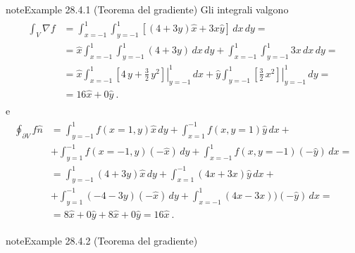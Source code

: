 \documentclass[letterpaper,10pt,italian]{jupyterBook}
\begin{document}
\begin{sphinxadmonition}{note}{Example 28.4.1 (Teorema del gradiente)}
\sphinxAtStartPar
Gli integrali valgono
\begin{equation*}
\begin{split}\begin{aligned}
  \int_V \nabla f
  & = \int_{x=-1}^{1} \int_{y=-1}^{1} \left[ (4 + 3 y) \hat{x} + 3 x \hat{y} \right] \, dx \, dy = \\
  & = \hat{x} \int_{x=-1}^{1} \int_{y=-1}^{1} (4 + 3 y) \, dx \, dy +  \int_{x=-1}^{1} \int_{y=-1}^{1} 3 x \, dx \, dy = \\
  & = \hat{x} \int_{x=-1}^{1} \left.\left[ 4 \, y + \frac{3}{2} \, y^2 \right]\right|_{y=-1}^{1} \, dx
    + \hat{y} \int_{y=-1}^{1} \left.\left[ \frac{3}{2} \, x^2 \right]\right|_{y=-1}^{1} \, dy = \\
  & = 16 \hat{x} + 0 \hat{y} \ .
\end{aligned}\end{split}
\end{equation*}
\sphinxAtStartPar
e
\begin{equation*}
\begin{split}\begin{aligned}
  \oint_{\partial V} f \hat{n}
  & = \int_{y = -1}^{ 1} f(x= 1, y   ) \hat{x} \, dy 
    + \int_{x =  1}^{-1} f(x   , y= 1) \hat{y} \, dx + \\ 
  & + \int_{y =  1}^{-1} f(x=-1, y   ) (- \hat{x} ) \, dy 
    + \int_{x = -1}^{ 1} f(x   , y=-1) (- \hat{y} ) \, dx = \\
  & = \int_{y = -1}^{ 1} ( 4     + 3     y )  \hat{x} \, dy 
    + \int_{x =  1}^{-1} ( 4  x  + 3  x    )  \hat{y} \, dx + \\ 
  & + \int_{y =  1}^{-1} (-4     - 3     y )  (- \hat{x} ) \, dy 
    + \int_{x = -1}^{ 1} ( 4  x  - 3  x   ))  (- \hat{y} ) \, dx = \\
  & = 8 \hat{x} + 0 \hat{y} + 8 \hat{x} + 0 \hat{y}
    = 16 \hat{x} \ .
\end{aligned}\end{split}
\end{equation*}\end{sphinxadmonition}
\label{ch/vector-calculus/stokes:thm-gradient-2}
\begin{sphinxadmonition}{note}{Example 28.4.2 (Teorema del gradiente)}


\end{sphinxadmonition}
\end{document}
